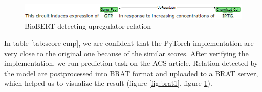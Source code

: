 \documentclass{article}
\begin{document}
\begin{figure}[ht]
\centering
\includegraphics{brat2}
\caption{BioBERT detecting upregulator relation}
\label{fig:brat2}
\end{figure}

In table \ref{tab:score-cmp}, we are confident that the PyTorch implementation are very close to the original one
because of the similar scores. After verifying the implementation, we run prediction task on the ACS article.
Relation detected by the model are postprocessed into BRAT format and uploaded to a BRAT server, which helped us to
visualize the result (figure \ref{fig:brat1}, figure \ref{fig:brat2}).
\end{document}
